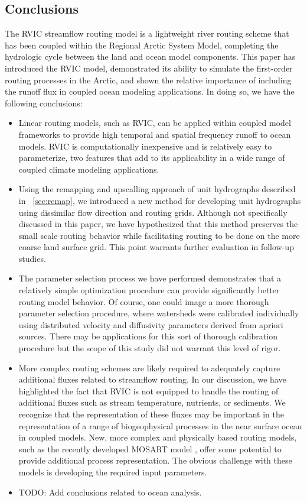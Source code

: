 \documentclass[jgrga, draft]{agutex}
\begin{document}
\begin{article}
\section{Conclusions}

The RVIC streamflow routing model is a lightweight river routing scheme that has been coupled within the Regional Arctic System Model, completing the hydrologic cycle between the land and ocean model components.
This paper has introduced the RVIC model, demonstrated its ability to simulate the first-order routing processes in the Arctic, and shown the relative importance of including the runoff flux in coupled ocean modeling applications.
In doing so, we have the following conclusions:
\begin{itemize}
\item Linear routing models, such as RVIC, can be applied within coupled model frameworks to provide high temporal and spatial frequency runoff to ocean models.
RVIC is computationally inexpensive and is relatively easy to parameterize, two features that add to its applicability in a wide range of coupled climate modeling applications.
\item Using the remapping and upscalling approach of unit hydrographs described in ~\ref{sec:remap}, we introduced a new method for developing unit hydrographs using dissimilar flow direction and routing grids.
Although not specifically discussed in this paper, we have hypothesized that this method preserves the small scale routing behavior while facilitating routing to be done on the more coarse land surface grid.
This point warrants further evaluation in follow-up studies.
\item The parameter selection process we have performed demonstrates that a relatively simple optimization procedure can provide significantly better routing model behavior.
Of course, one could image a more thorough parameter selection procedure, where watersheds were calibrated individually using distributed velocity and diffusivity parameters derived from apriori sources.
There may be applications for this sort of thorough calibration procedure but the scope of this study did not warrant this level of rigor.
\item More complex routing schemes are likely required to adequately capture additional fluxes related to streamflow routing.
In our discussion, we have highlighted the fact that RVIC is not equipped to handle the routing of additional fluxes such as stream temperature, nutrients, or sediments.
We recognize that the representation of these fluxes may be important in the representation of a range of biogeophysical processes in the near surface ocean in coupled models.
New, more complex and physically based routing models, such as the recently developed MOSART model \citep{Li_2013}, offer some potential to provide additional process representation.
The obvious challenge with these models is developing the required input parameters.
\item TODO: Add conclusions related to ocean analysis.
\end{itemize}


\end{article}
\end{document}
